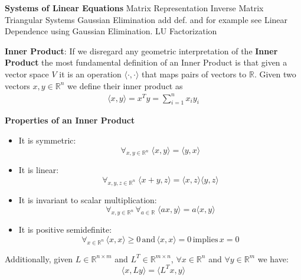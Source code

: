 \documentclass[12pt]{article}
\newenvironment{definition}[2][Definition]{\begin{trivlist}
\item[\hskip \labelsep {\bfseries #1}\hskip \labelsep {\bfseries #2}]}{\end{trivlist}}
\newenvironment{corollary}[2][Corollary]{\begin{trivlist}
\item[\hskip \labelsep {\bfseries #1}\hskip \labelsep {\bfseries #2}]}{\end{trivlist}}
\begin{document}
\begin{definition}{2.9} \textbf{Systems of Linear Equations}
\noindent
\bigskip
Matrix Representation
\noindent
\bigskip
Inverse Matrix
\noindent
\bigskip
Triangular Systems
\noindent
\bigskip
Gaussian Elimination add def. and for example see Linear Dependence using Gaussian Elimination.
\noindent
\bigskip
LU Factorization
\end{definition}


\begin{definition}{2.10} \textbf{Inner Product}: If we disregard any geometric interpretation of the \textbf{Inner Product} the most fundamental definition of an Inner Product is that given a vector space $V$ it is an operation \(\langle \cdot,\cdot \rangle\) that maps pairs of vectors to \(\mathbb{R}\). Given two vectors \(x,y \in \mathbb{R}^n\) we define their inner product as
\begin{equation}
\begin{split}
    \langle x, y \rangle = x^T y = \sum^n_{i=1} x_i y_i
\end{split}
\end{equation}
\begin{corollary}{2.10.1} \textbf{Properties of an Inner Product}
\begin{itemize}
    \item It is symmetric: \[\forall_{x,y \in \mathbb{R}^n} \; \langle x,y \rangle = \langle y,x \rangle\]
    \item It is linear: \[\forall_{x,y,z \in \mathbb{R}^n} \; \langle x+y,z \rangle = \langle x,z \rangle \langle y,z \rangle \]
    \item It is invariant to scalar multiplication: \[\forall_{x,y \in \mathbb{R}^n} \, \forall_{a \in \mathbb{R}} \; \langle ax,y \rangle = a \langle x,y \rangle \]
    \item It is positive semidefinite: \[\forall_{x \in \mathbb{R}^n} \, \langle x,x \rangle \geq 0 \,\textrm{and}\, \langle x,x \rangle = 0 \, \textrm{implies} \, x = 0 \]
\end{itemize}
\noindent
Additionally, given \(L \in \mathbb{R}^{n \times m}\) and \(L^T \in \mathbb{R}^{m \times n}\), \(\forall x \in \mathbb{R}^n\) and \(\forall y \in \mathbb{R}^m\) we have:
\[\langle x,Ly \rangle = \langle L^T x,y \rangle\]
\end{corollary}


\end{definition}
\end{document}
